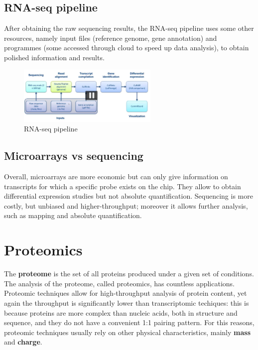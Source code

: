     \subsection{RNA-seq pipeline}
      After obtaining the raw sequencing results, the RNA-seq pipeline uses some other resources, namely input files (reference genome, gene annotation) and programmes (some accessed through cloud to speed up data analysis), to obtain polished information and results.

      \begin{figure}[ht]
      \caption{RNA-seq pipeline}
      \centering
      \includegraphics[width=0.6\textwidth]{RNAseqpipeline.PNG}
      \end{figure}

    \subsection{Microarrays vs sequencing}
      Overall, microarrays are more economic but can only give information on transcripts for which a specific probe exists on the chip. They allow to obtain differential expression studies but not absolute quantification. Sequencing is more costly, but unbiased and higher-throughput; moreover it allows further analysis, such as mapping and absolute quantification.

  \section{Proteomics}
    The \textbf{proteome} is the set of all proteins produced under a given set of conditions. The analysis of the proteome, called proteomics, has countless applications. Proteomic techniques allow for high-throughput analysis of protein content, yet again the throughput is significantly lower than transcriptomic techiques: this is because proteins are more complex than nucleic acids, both in structure and sequence, and they do not have a convenient 1:1 pairing pattern. For this reasons, proteomic techniques usually rely on other physical characteristics, mainly \textbf{mass} and \textbf{charge}.

